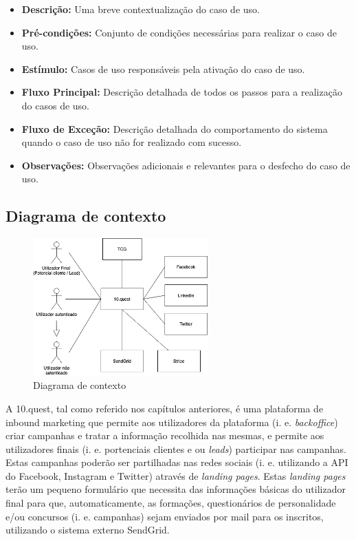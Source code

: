 \begin{itemize}
	\item \textbf{Descrição:} Uma breve contextualização do caso de uso.
	\item \textbf{Pré-condições:} Conjunto de condições necessárias para realizar o caso de uso.
	\item \textbf{Estímulo:} Casos de uso responsáveis pela ativação do caso de uso.
	\item \textbf{Fluxo Principal:} Descrição detalhada de todos os passos para a realização do casos de uso.
	\item \textbf{Fluxo de Exceção:} Descrição detalhada do comportamento do sistema quando o caso de uso não for realizado com sucesso.
	\item \textbf{Observações:} Observações adicionais e relevantes para o desfecho do caso de uso.
\end{itemize}

\newpage

\subsection{Diagrama de contexto}
\label{d:contexto}
\begin{figure}[ht!]
	\begin{center}
		\includegraphics[width=0.6\textwidth]{img/rf/10quest}
		\caption{Diagrama de contexto}
		\label{fig:rf-10quest}
	\end{center}
\end{figure}

A 10.quest, tal como referido nos capítulos anteriores, é uma plataforma de inbound marketing que permite aos utilizadores da plataforma (i. e. \textit{backoffice}) criar campanhas e tratar a informação recolhida nas mesmas, e permite aos utilizadores finais (i. e. portenciais clientes e ou \textit{leads}) participar nas campanhas. 
Estas campanhas poderão ser partilhadas nas redes sociais (i. e. utilizando a API do Facebook, Instagram e Twitter) através de \textit{landing pages}. Estas \textit{landing pages} terão um pequeno formulário que necessita das informações básicas do utilizador final para que, automaticamente, as formações, questionários de personalidade e/ou concursos (i. e. campanhas) sejam enviados por mail para os inscritos, utilizando o sistema externo SendGrid.

